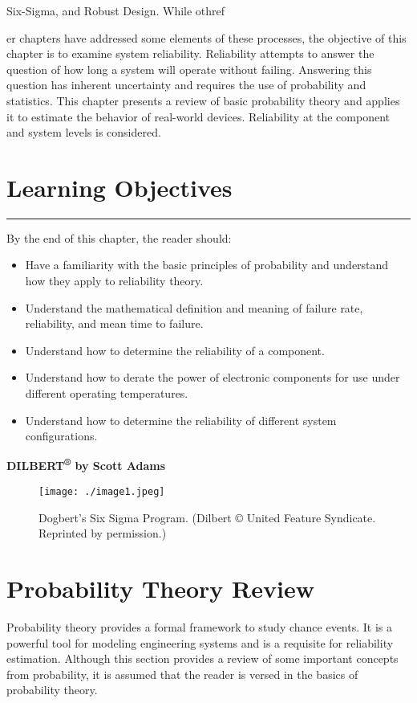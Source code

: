 Six-Sigma, and Robust Design. While othref{er chapters have addressed some
elements of these processes, the objective of this chapter is to examine
system reliability. Reliability attempts to answer the question of how
long a system will operate without failing. Answering this question has
inherent uncertainty and requires the use of probability and statistics.
This chapter presents a review of basic probability theory and applies
it to estimate the behavior of real-world devices. Reliability at the
component and system levels is considered.

\section*{Learning Objectives}
\noindent\rule{\linewidth}{1pt}
By the end of this chapter, the reader should:


\begin{itemize}
\item
  Have a familiarity with the basic principles of probability and
  understand how they apply to reliability theory.
\item
  Understand the mathematical definition and meaning of failure rate,
  reliability, and mean time to failure.
\item
  Understand how to determine the reliability of a component.
\item
  Understand how to derate the power of electronic components for use
  under different operating temperatures.
\item
  Understand how to determine the reliability of different system
  configurations.
\end{itemize}

\textbf{\hfill\break
DILBERT\textsuperscript{®} by Scott Adams}

\begin{figure}[h]
\centering
\texttt{[image: ./image1.jpeg]}
\caption{Dogbert's Six Sigma Program. (Dilbert © United Feature Syndicate. Reprinted by
permission.)}
\label{figure:dilbert6sigma}
\end{figure}


\section{Probability Theory Review}
\label{section:probability-theory-review}

Probability theory provides a formal framework to study chance events.
It is a powerful tool for modeling engineering systems and is a
requisite for reliability estimation. Although this section provides a
review of some important concepts from probability, it is assumed that
the reader is versed in the basics of probability theory.

}
